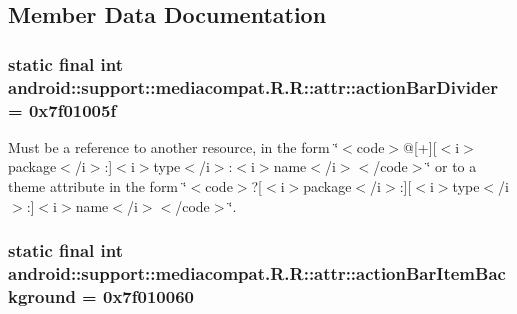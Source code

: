 \subsection{Member Data Documentation}
\hypertarget{classandroid_1_1support_1_1mediacompat_1_1_r_1_1attr_f195337b8a844f715f0d4e8d4ef84602}{
\subsubsection[{actionBarDivider}]{\setlength{\rightskip}{0pt plus 5cm}static final int android::support::mediacompat.R.R::attr::actionBarDivider = 0x7f01005f}}
\label{classandroid_1_1support_1_1mediacompat_1_1_r_1_1attr_f195337b8a844f715f0d4e8d4ef84602}


Must be a reference to another resource, in the form \char`\"{}$<$code$>$@\mbox{[}+\mbox{]}\mbox{[}$<$i$>$package$<$/i$>$:\mbox{]}$<$i$>$type$<$/i$>$:$<$i$>$name$<$/i$>$$<$/code$>$\char`\"{} or to a theme attribute in the form \char`\"{}$<$code$>$?\mbox{[}$<$i$>$package$<$/i$>$:\mbox{]}\mbox{[}$<$i$>$type$<$/i$>$:\mbox{]}$<$i$>$name$<$/i$>$$<$/code$>$\char`\"{}. \hypertarget{classandroid_1_1support_1_1mediacompat_1_1_r_1_1attr_42ac513b5553f89cf9ca3157c4a155ab}{
\subsubsection[{actionBarItemBackground}]{\setlength{\rightskip}{0pt plus 5cm}static final int android::support::mediacompat.R.R::attr::actionBarItemBackground = 0x7f010060}}
\label{classandroid_1_1support_1_1mediacompat_1_1_r_1_1attr_42ac513b5553f89cf9ca3157c4a155ab}


